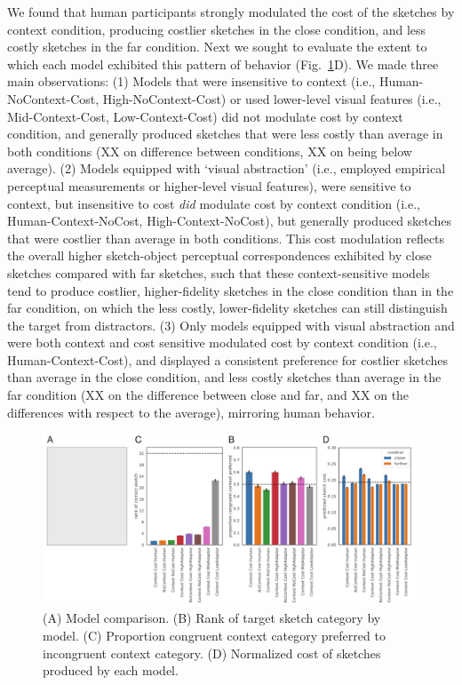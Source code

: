 \documentclass[9pt,twocolumn,twoside]{pnas-new}
\newcommand{\mwu}[1]{{\color{green}{[mwu: #1]}}}
\begin{document}
We found that human participants strongly modulated the cost of the sketches by context condition, producing costlier sketches in the close condition, and less costly sketches in the far condition. Next we sought to evaluate the extent to which each model exhibited this pattern of behavior (Fig.~\ref{model_results}D). We made three main observations: (1) Models that were insensitive to context (i.e., Human-NoContext-Cost, High-NoContext-Cost) or used lower-level visual features (i.e., Mid-Context-Cost, Low-Context-Cost) did not modulate cost by context condition, and generally produced sketches that were less costly than average in both conditions (XX on difference between conditions, XX on being below average). (2) Models equipped with `visual abstraction' (i.e., employed empirical perceptual measurements or higher-level visual features), were sensitive to context, but insensitive to cost \textit{did} modulate cost by context condition (i.e., Human-Context-NoCost, High-Context-NoCost), but generally produced sketches that were costlier than average in both conditions. \mwu{this paragrpah is a lot; i read it a few times and didnt get it.} This cost modulation reflects the overall higher sketch-object perceptual correspondences exhibited by close sketches compared with far sketches, such that these context-sensitive models tend to produce costlier, higher-fidelity sketches in the close condition than in the far condition, on which the less costly, lower-fidelity sketches can still distinguish the target from distractors. (3) Only models equipped with visual abstraction and were both context and cost sensitive modulated cost by context condition (i.e., Human-Context-Cost), and displayed a consistent preference for costlier sketches than average in the close condition, and less costly sketches than average in the far condition (XX on the difference between close and far, and XX on the differences with respect to the average), mirroring human behavior.

\begin{figure}[htbp]
\centering
\includegraphics[width=0.99\textwidth]{figures/5_model_results.pdf}
\caption{(A) Model comparison. (B) Rank of target sketch category by model. (C) Proportion congruent context category preferred to incongruent context category. (D) Normalized cost of sketches produced by each model.}
\label{model_results}
\end{figure}
\end{document}
